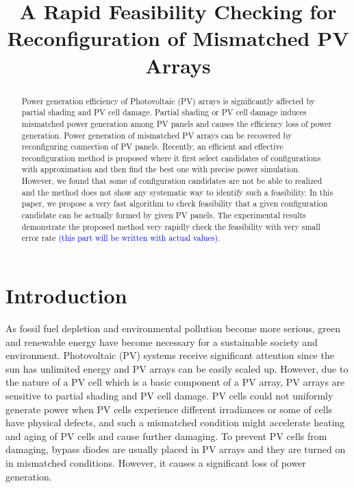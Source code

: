 \documentclass[conference]{IEEEtran}
\begin{document}
\title{A Rapid Feasibility Checking for Reconfiguration of Mismatched PV Arrays}
\author{
}
\maketitle

\begin{abstract}
Power generation efficiency of Photovoltaic (PV) arrays is significantly affected by partial shading and PV cell damage. Partial shading or PV cell damage induces mismatched power generation among PV panels and causes the efficiency loss of power generation. Power generation of mismatched PV arrays can be recovered by reconfiguring connection of PV panels. Recently, an efficient and effective reconfiguration method is proposed where it first select candidates of configurations with approximation and then find the best one with precise power simulation. However, we found that some of  configuration candidates are not be able to realized and the method does not show any systematic way to identify such a feasibility. In this paper, we propose a very fast algorithm to check feasibility that a given configuration candidate can be actually formed by given PV panels. The experimental results demonstrate the proposed method very rapidly check the feasibility with very small error rate \textcolor{blue}{(this part will be written with actual values)}.
\end{abstract}


\section{Introduction}
As fossil fuel depletion and environmental pollution become more serious, green and renewable energy have become necessary for a sustainable society and environment. Photovoltaic (PV) systems receive significant attention since the sun has unlimited energy and PV arrays can be easily scaled up. However, due to the nature of a PV cell which is a basic component of a PV array, PV arrays are sensitive to partial shading and PV cell damage. PV cells could not uniformly generate power when PV cells experience different irradiances or some of cells have physical defects, and such a mismatched condition might accelerate heating and aging of PV cells and cause further damaging. To prevent PV cells from damaging, bypass diodes are usually placed in PV arrays and they are turned on in mismatched conditions. However, it causes a significant loss of power generation. 
\end{document}
